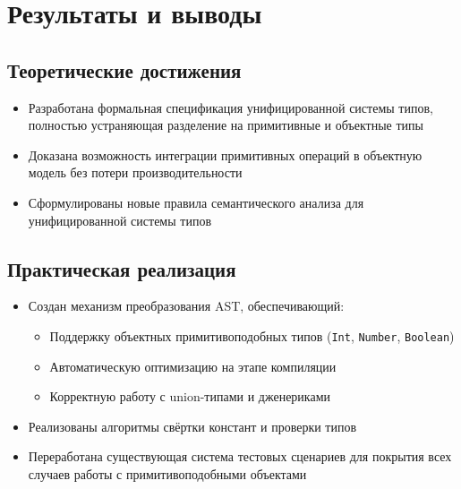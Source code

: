 \section{Результаты и выводы}
\label{sec:Chapter5} 
\subsection{Теоретические достижения}
\begin{itemize}[leftmargin=*]
    \item Разработана формальная спецификация унифицированной системы типов, полностью устраняющая разделение на примитивные и объектные типы
    \item Доказана возможность интеграции примитивных операций в объектную модель без потери производительности
    \item Сформулированы новые правила семантического анализа для унифицированной системы типов
\end{itemize}

\subsection*{Практическая реализация}
\begin{itemize}[leftmargin=*]
    \item Создан механизм преобразования AST, обеспечивающий:
    \begin{itemize}
        \item Поддержку объектных примитивоподобных типов (\texttt{Int}, \texttt{Number}, \texttt{Boolean})
        \item Автоматическую оптимизацию на этапе компиляции
        \item Корректную работу с union-типами и дженериками
    \end{itemize}
    \item Реализованы алгоритмы свёртки констант и проверки типов
    \item Переработана существующая система тестовых сценариев для покрытия всех случаев работы с примитивоподобными объектами
\end{itemize}

